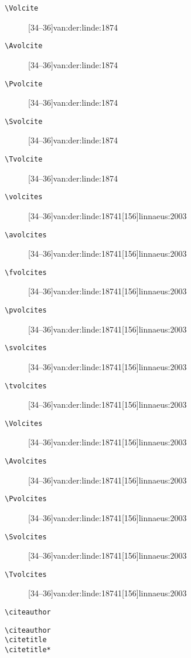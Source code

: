 \documentclass[a4paper,12pt]{scrartcl}
\newcommand*{\Befehl}[1]{\texttt{\textbackslash#1}}
\begin{document}
\begin{description}
	\item[\footnotesize\Befehl{Volcite}] [34--36]{van:der:linde:1874}
	\item[\footnotesize\Befehl{Avolcite}] [34--36]{van:der:linde:1874}
	\item[\footnotesize\Befehl{Pvolcite}] [34--36]{van:der:linde:1874}
	\item[\footnotesize\Befehl{Svolcite}] [34--36]{van:der:linde:1874}
	\item[\footnotesize\Befehl{Tvolcite}] [34--36]{van:der:linde:1874}
	\item[\footnotesize\Befehl{volcites}] [34--36]{van:der:linde:1874}{1}[156]{linnaeus:2003}
	\item[\footnotesize\Befehl{avolcites}] [34--36]{van:der:linde:1874}{1}[156]{linnaeus:2003}
	\item[\footnotesize\Befehl{fvolcites}] [34--36]{van:der:linde:1874}{1}[156]{linnaeus:2003}
	\item[\footnotesize\Befehl{pvolcites}] [34--36]{van:der:linde:1874}{1}[156]{linnaeus:2003}
	\item[\footnotesize\Befehl{svolcites}] [34--36]{van:der:linde:1874}{1}[156]{linnaeus:2003}
	\item[\footnotesize\Befehl{tvolcites}] [34--36]{van:der:linde:1874}{1}[156]{linnaeus:2003}
	\item[\footnotesize\Befehl{Volcites}] [34--36]{van:der:linde:1874}{1}[156]{linnaeus:2003}
	\item[\footnotesize\Befehl{Avolcites}] [34--36]{van:der:linde:1874}{1}[156]{linnaeus:2003}
	\item[\footnotesize\Befehl{Pvolcites}] [34--36]{van:der:linde:1874}{1}[156]{linnaeus:2003}
	\item[\footnotesize\Befehl{Svolcites}] [34--36]{van:der:linde:1874}{1}[156]{linnaeus:2003}
	\item[\footnotesize\Befehl{Tvolcites}] [34--36]{van:der:linde:1874}{1}[156]{linnaeus:2003}
    \item[\footnotesize\Befehl{citeauthor}] \citeauthor{auler:hiller:2015}
    \item[\footnotesize\Befehl{citeauthor}] 
    \item[\footnotesize\Befehl{citetitle}] 
    \item[\footnotesize\Befehl{citetitle*}] 

\end{description}
\end{document}
